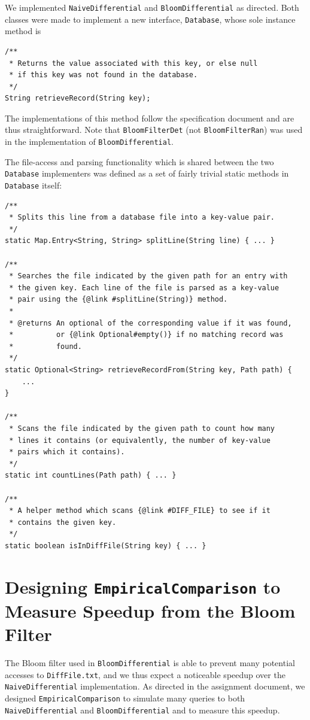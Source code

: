 \documentclass{article}
\begin{document}
We implemented \texttt{NaiveDifferential} and \texttt{BloomDifferential} as
directed. Both classes were made to implement a new interface,
\texttt{Database}, whose sole instance method is

\begin{lstlisting}
/**
 * Returns the value associated with this key, or else null
 * if this key was not found in the database.
 */
String retrieveRecord(String key);
\end{lstlisting}

The implementations of this method follow the specification document and are
thus straightforward. Note that \texttt{BloomFilterDet} (not
\texttt{BloomFilterRan}) was used in the implementation of
\texttt{BloomDifferential}.

The file-access and parsing functionality which is shared between the two
\texttt{Database} implementers was defined as a set of fairly trivial static
methods in \texttt{Database} itself:

\begin{lstlisting}
/**
 * Splits this line from a database file into a key-value pair.
 */
static Map.Entry<String, String> splitLine(String line) { ... }

/**
 * Searches the file indicated by the given path for an entry with
 * the given key. Each line of the file is parsed as a key-value
 * pair using the {@link #splitLine(String)} method.
 *
 * @returns An optional of the corresponding value if it was found,
 *          or {@link Optional#empty()} if no matching record was
 *          found.
 */
static Optional<String> retrieveRecordFrom(String key, Path path) {
    ...
}

/**
 * Scans the file indicated by the given path to count how many
 * lines it contains (or equivalently, the number of key-value
 * pairs which it contains).
 */
static int countLines(Path path) { ... }

/**
 * A helper method which scans {@link #DIFF_FILE} to see if it
 * contains the given key.
 */
static boolean isInDiffFile(String key) { ... }
\end{lstlisting}


\section{Designing \texttt{EmpiricalComparison} to Measure Speedup from the
         Bloom Filter}

The Bloom filter used in \texttt{BloomDifferential} is able to prevent many
potential accesses to \texttt{DiffFile.txt}, and we thus expect a noticeable
speedup over the \texttt{NaiveDifferential} implementation. As directed in the
assignment document, we designed \texttt{EmpiricalComparison} to simulate many
queries to both \texttt{NaiveDifferential} and \texttt{BloomDifferential} and to
measure this speedup.
\end{document}
